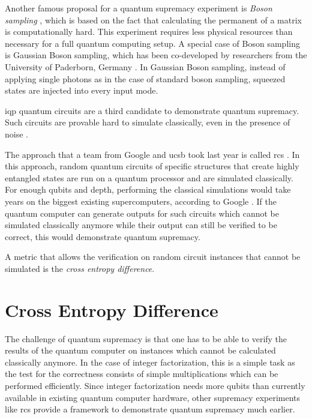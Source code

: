 Another famous proposal for a quantum supremacy experiment is \textit{Boson sampling} \cite{aaronson2013boson}, which is based on the
fact that calculating the permanent of a matrix is computationally hard. This experiment requires less 
physical resources than necessary for a full quantum computing setup. A special case of 
Boson sampling is Gaussian Boson sampling, which has been co-developed by researchers 
from the University of Paderborn, Germany \cite{Hamilton2017}. In Gaussian Boson sampling, 
instead of applying single photons as in the case of standard boson sampling,
squeezed states are injected into every input mode.

\gls{iqp} quantum circuits are a third candidate to demonstrate 
quantum supremacy. Such circuits are provable hard to simulate classically, even in the presence of 
noise \cite{Bremner2017}.

The approach that a team from Google and \gls{ucsb} took last year is called
\gls{rcs} \cite{Boixo2018supremacy, martines2019supremacy}. In this approach, random quantum circuits of specific structures that create highly
entangled states are run on a quantum processor and are simulated classically. For 
enough qubits and depth, performing the classical simulations would take years on the biggest 
existing supercomputers, according to Google \cite{martines2019supremacy}. If the quantum computer can generate outputs
for such circuits which cannot be simulated classically anymore while their output can still be
verified to be correct, this would demonstrate quantum supremacy. 

A metric that
allows the verification on random circuit instances that cannot be simulated is
the \textit{cross entropy difference}.

\section{Cross Entropy Difference}
\label{sec:cross_entropy}

The challenge of quantum supremacy is that one has to be able to verify the
results of the quantum computer on instances which cannot be calculated
classically anymore. In the case of integer factorization, this is a simple task
as the test for the correctness consists of simple multiplications which can be
performed efficiently. Since integer factorization needs more qubits than
currently available in existing quantum computer hardware, other supremacy
experiments like \gls{rcs} provide a framework to demonstrate quantum supremacy much
earlier.

